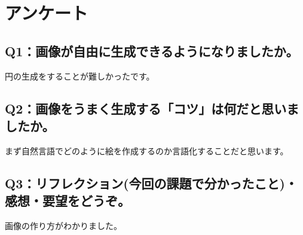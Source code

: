 \documentclass[12pt,a4j]{jarticle}
\begin{document}
\section{アンケート}

\subsection{Q1：画像が自由に生成できるようになりましたか。}

円の生成をすることが難しかったです。

\subsection{Q2：画像をうまく生成する「コツ」は何だと思いましたか。}

まず自然言語でどのように絵を作成するのか言語化することだと思います。

\subsection{Q3：リフレクション(今回の課題で分かったこと)・感想・要望をどうぞ。}

画像の作り方がわかりました。
\end{document}
